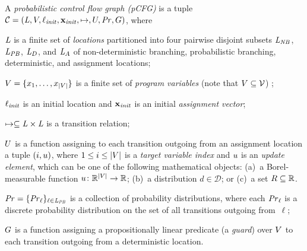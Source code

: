 \smallskip
\begin{definition}
\label{def:stochgame}
A \emph{probabilistic control flow graph (pCFG)} is a tuple
$\mathcal{C}=(\mathit{L},V,\ell_{\mathit{init}},\mathbf{x}_{\mathit{init}},\mapsto,U,\mathit{Pr},G)$,
where
\begin{compactitem}
\item $\mathit{L}$ is a finite set of \emph{locations} partitioned into four 
pairwise
disjoint subsets  $\mathit{L}_{\mathit{NB}}$, $\mathit{L}_{\mathit{PB}}$, $\mathit{L}_D$, and $\mathit{L}_A$ of 
non-deterministic branching, 
probabilistic branching, deterministic, and assignment locations;
\item $V=\{x_1,\dots,x_{|V|}\}$ is a finite set of \emph{program 
variables} (note that $V \subseteq \mathcal{V}$) ;
\item $\ell_{\mathit{init}}$ is an initial location and $\mathbf{x}_{\mathit{init}}$ is an initial 
\emph{assignment vector};
\item $\mapsto\subseteq\mathit{L}\times\mathit{L}$ is a transition relation;
\item $U$ is a function assigning to each transition outgoing from an 
assignment location a tuple $(i,u)$, where $1\leq i \leq |V|$ is a 
\emph{target 
	variable index} and $u$ 
is an 
\emph{update element}, which can 
be one of the following mathematical objects: %
(a)~a Borel-measurable function $u\colon \mathbb{R}^{|V|}\rightarrow \mathbb{R}$;
(b)~a distribution $d\in \mathcal{D}$; or
(c)~a set $R\subseteq \mathbb{R}$.
\item $\mathit{Pr}=\{\mathit{Pr}_{\ell}\}_{\ell \in \mathit{L}_{\mathit{PB}}}$ is a collection of
probability distributions, where each $\mathit{Pr}_{\ell}$ is a discrete probability
distribution on the set of all transitions outgoing from~$\ell$;
\item $G$ is a function assigning a propositionally linear predicate
(a \emph{guard}) over $V$ to each transition outgoing from a deterministic 
location.
\end{compactitem}


\end{definition}
